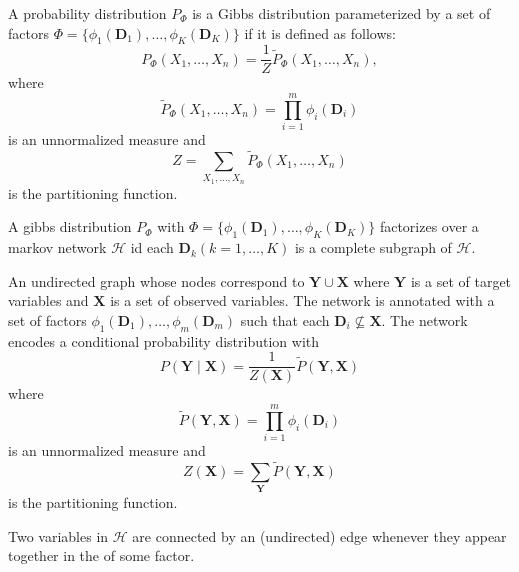 {%
  A \gls{probability distribution} $P_{\Phi}$ is a Gibbs distribution parameterized by a set of \glspl{factor} $\Phi=\{\phi_1(\bm{D}_1),\dots,\phi_K(\bm{D}_K)\}$ if it is defined as follows:
  \begin{equation*}
    P_{\Phi}(X_1,\dots,X_n)=\frac{1}{Z}\tilde{P}_{\Phi}(X_1,\dots,X_n),
  \end{equation*}
  where
  \begin{equation*}
    \tilde{P}_{\Phi}(X_1,\dots,X_n)=\prod_{i=1}^{m}\phi_i(\bm{D}_i)
  \end{equation*}
  is an unnormalized measure and
  \begin{equation*}
    Z=\sum_{X_1,\ldots,X_n}\tilde{P}_{\Phi}(X_1,\dots,X_n)
  \end{equation*}
  is the \gls{partitioning function}.
}

{%
  A \gls{gibbs distribution} $P_{\Phi}$ with $\Phi=\{\phi_1(\bm{D}_1),\dots,\phi_K(\bm{D}_K)\}$ factorizes over a \gls{markov
network} $\mathcal{H}$ id each $\bm{D}_{k}(k=1,\dots,K)$ is a \gls{complete subgraph} of $\mathcal{H}$.
}

{%
An undirected \gls{graph} whose \glspl{node} correspond to $\bm{Y}\cup\bm{X}$ where $\bm{Y}$ is a set of \glspl{target variable} and $\bm{X}$ is a set of \glspl{observed variable}. The network is annotated with a set of \glspl{factor} $\phi_1(\bm{D}_1),\dots,\phi_m(\bm{D}_m)$ such that each $\bm{D}_i\nsubseteq\bm{X}$. The network encodes a \gls{conditional probability distribution} with
  \begin{equation*}
    P(\bm{Y}\mid\bm{X})=\frac{1}{Z(\bm{X})}\tilde{P}(\bm{Y},\bm{X})
  \end{equation*}
  where
  \begin{equation*}
    \tilde{P}(\bm{Y},\bm{X})=\prod_{i=1}^{m}\phi_i(\bm{D}_i)
  \end{equation*}
  is an unnormalized measure and
  \begin{equation*}
    Z(\bm{X})=\sum_{\bm{Y}}\tilde{P}(\bm{Y},\bm{X})
  \end{equation*}
  is the \gls{partitioning function}.

  Two variables in $\mathcal{H}$ are connected by an (undirected) \gls{edge} whenever they appear together in the  of some \gls{factor}.
}

